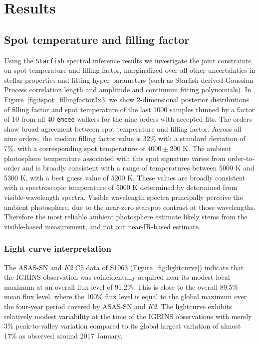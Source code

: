 \documentclass[modern,trackchanges]{aastex631}
\begin{document}




\section{Results}
\label{sec:results}

\subsection{Spot temperature and filling factor}
\label{sec:starfishresults}
Using the \texttt{Starfish} spectral inference results we investigate the joint constraints on spot temperature and filling factor, marginalized over all other uncertainties in stellar properties and fitting hyper-parameters (such as Starfish-derived Gaussian Process correlation length and amplitude and continuum fitting polynomials). In Figure~\ref{fig:tspot_fillingfactor3x3} we show 2-dimensional posterior distributions of filling factor and spot temperature of the last 1000 samples thinned by a factor of 10 from all 40 \texttt{emcee} walkers for the nine orders with accepted fits. The orders show broad agreement between spot temperature and filling factor. Across all nine orders, the median filling factor value is 32\% with a standard deviation of 7\%, with a corresponding spot temperature of $4000 \pm 200$ K. The ambient photosphere temperature associated with this spot signature varies from order-to-order and is broadly consistent with a range of temperatures between 5000 K and 5300 K, with a best guess value of $5200$ K.  These values are broadly consistent with a spectroscopic temperature of 5000 K determined by \citet{mathieu03} determined from visible-wavelength spectra.  Visible wavelength spectra principally perceive the ambient photosphere, due to the near-zero starspot contrast at those wavelengths.  Therefore the most reliable ambient photosphere estimate likely stems from the visible-based measurement, and not our near-IR-based estimate.

\subsubsection{Light curve interpretation}
The ASAS-SN and \textit{K2} C5 data of S1063 (Figure~\ref{fig:lightcurve}) indicate that the IGRINS observation was coincidentally acquired near its modest local maximum at an overall flux level of 91.2\%. This is close to the overall 89.5\% mean flux level, where the 100\% flux level is equal to the global maximum over the four-year period covered by ASAS-SN and \textit{K2}. The lightcurve exhibits relatively modest variability at the time of the IGRINS observations with merely 3\% peak-to-valley variation compared to its global largest variation of almost 17\% as observed around 2017 January.  
\end{document}
